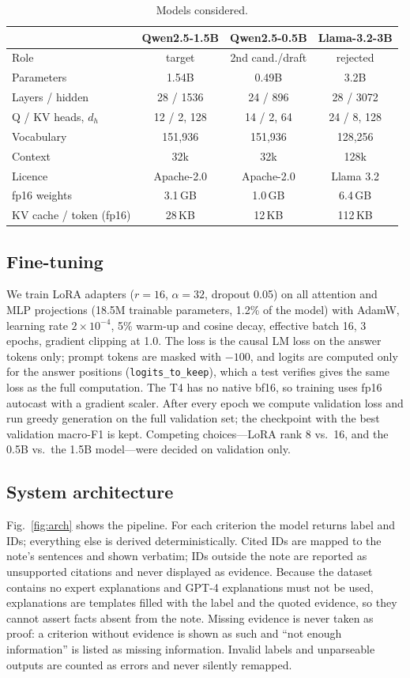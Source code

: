 \documentclass[conference]{IEEEtran}
\begin{document}
\begin{table}[t]
\centering
\caption{Models considered.}
\label{tab:models}
\setlength{\tabcolsep}{3pt}
\begin{tabular}{lccc}
\toprule
 & Qwen2.5-1.5B & Qwen2.5-0.5B & Llama-3.2-3B \\
\midrule
Role & target & 2nd cand./draft & rejected \\
Parameters & 1.54B & 0.49B & 3.2B \\
Layers / hidden & 28 / 1536 & 24 / 896 & 28 / 3072 \\
Q / KV heads, $d_h$ & 12 / 2, 128 & 14 / 2, 64 & 24 / 8, 128 \\
Vocabulary & 151{,}936 & 151{,}936 & 128{,}256 \\
Context & 32k & 32k & 128k \\
Licence & Apache-2.0 & Apache-2.0 & Llama 3.2 \\
fp16 weights & 3.1\,GB & 1.0\,GB & 6.4\,GB \\
KV cache / token (fp16) & 28\,KB & 12\,KB & 112\,KB \\
\bottomrule
\end{tabular}
\end{table}

\subsection{Fine-tuning}
We train LoRA adapters ($r=16$, $\alpha=32$, dropout 0.05) on all attention and MLP projections (18.5M trainable parameters, 1.2\% of the model) with AdamW, learning rate $2\times10^{-4}$, 5\% warm-up and cosine decay, effective batch 16, 3 epochs, gradient clipping at 1.0. The loss is the causal LM loss on the answer tokens only; prompt tokens are masked with $-100$, and logits are computed only for the answer positions (\texttt{logits\_to\_keep}), which a test verifies gives the same loss as the full computation. The T4 has no native bf16, so training uses fp16 autocast with a gradient scaler. After every epoch we compute validation loss and run greedy generation on the full validation set; the checkpoint with the best validation macro-F1 is kept. Competing choices---LoRA rank 8 vs.\ 16, and the 0.5B vs.\ the 1.5B model---were decided on validation only.

\subsection{System architecture}
Fig.~\ref{fig:arch} shows the pipeline. For each criterion the model returns label and IDs; everything else is derived deterministically. Cited IDs are mapped to the note's sentences and shown verbatim; IDs outside the note are reported as unsupported citations and never displayed as evidence. Because the dataset contains no expert explanations and GPT-4 explanations must not be used, explanations are templates filled with the label and the quoted evidence, so they cannot assert facts absent from the note. Missing evidence is never taken as proof: a criterion without evidence is shown as such and ``not enough information'' is listed as missing information. Invalid labels and unparseable outputs are counted as errors and never silently remapped.
\end{document}
